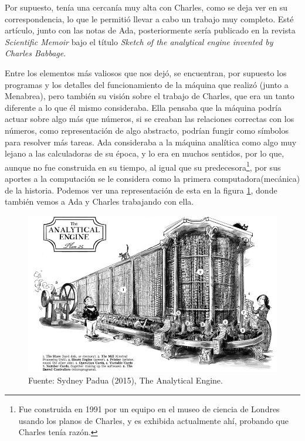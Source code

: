 \documentclass[letterpaper,12pt,oneside]{book}
\begin{document}
        Por supuesto, tenía una cercanía muy alta con Charles, como se deja ver en su correspondencia, lo que le permitió llevar a cabo un 	
		trabajo muy completo. Esté artículo, junto con las notas de Ada, posteriormente sería publicado
		en la revista \textit{Scientific Memoir} bajo el título \textit{Sketch of the analytical engine invented by Charles Babbage}\cite{eric_kim_ada_1999}.
  
        Entre los elementos más valiosos que nos 
		dejó, se encuentran, por supuesto los programas y los detalles del funcionamiento de la máquina que realizó (junto a Menabrea), pero también su visión sobre el trabajo de 
		Charles, que era un tanto diferente a lo que él mismo consideraba. Ella pensaba que la máquina podría actuar sobre  algo más que números, si se creaban las relaciones correctas con los números,  como representación de algo 
		abstracto, podrían fungir como símbolos para resolver más tareas. Ada consideraba a la máquina analítica como algo muy lejano a las calculadoras de su época,
		y lo era en muchos sentidos, por lo que, aunque no fue construida en su tiempo, al igual que su predecesora\footnote{Fue construida en 1991 por un equipo en el museo de ciencia de Londres usando los planos de Charles, y es exhibida actualmente ahí, probando que Charles tenía razón.}, por sus aportes a la computación
		se le considera como la primera computadora(mecánica) de la historia\cite{eric_kim_ada_1999}. Podemos
  ver una representación de esta en la figura \ref{fig:analytical_engine}, donde también vemos a Ada y
  Charles trabajando con ella.
		
		\begin{figure}
		    \centering
		    \includegraphics[scale = 0.5]{media/Historia/analyticalEngine1_sydbeypadua.jpg}
		    \caption{Fuente: Sydney Padua (2015), The Analytical Engine.}
	    	\label{fig:analytical_engine}
		\end{figure}
				
\end{document}
